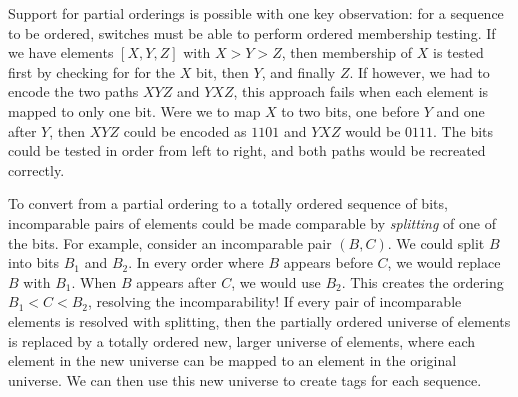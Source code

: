 Support for partial orderings is possible with one key observation: for a sequence to be ordered, switches must be able to perform ordered membership testing. If we have elements $[X,Y,Z]$ with $X > Y > Z$, then membership of $X$ is tested first by checking for for the $X$ bit, then $Y$, and finally $Z$. If however, we had to encode the two paths $XYZ$ and $YXZ$, this approach fails when each element is mapped to only one bit. Were we to map $X$ to two bits, one before $Y$ and one after $Y$, then $XYZ$ could be encoded as $1101$ and $YXZ$ would be $0111$. The bits could be tested in order from left to right, and both paths would be recreated correctly. 

To convert from a partial ordering to a totally ordered sequence of bits, incomparable pairs of elements could be made comparable by \textit{splitting} of one of the bits. For example, consider an incomparable pair $(B, C)$. We could split $B$ into bits $B_1$ and $B_2$. In every order where $B$ appears before $C$, we would replace $B$ with $B_1$. When $B$ appears after $C$, we would use $B_2$. This creates the ordering $B_1 < C < B_2$, resolving the incomparability! If every pair of incomparable elements is resolved with splitting, then the partially ordered universe of elements is replaced by a totally ordered new, larger universe of elements, where each element in the new universe can be mapped to an element in the original universe. We can then use this new universe to create tags for each sequence. 